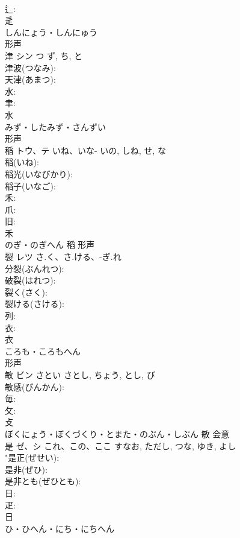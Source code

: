 \documentclass[8pt]{extreport}
\begin{document}
\begin{CJK}{UTF8}{min}
\\	辶: 
\\	辵	
\\	しんにょう・しんにゅう	
\\	形声 
\\	津	シン	つ	ず, ち, と	
\\	津波(つなみ): 
\\	天津(あまつ): 
\\	水: 
\\	聿: 
\\	水	
\\	みず・したみず・さんずい	
\\	形声 
\\	稲	トウ、テ	いね、いな-	いの, しね, せ, な	
\\	稲(いね): 
\\	稲光(いなびかり): 
\\	稲子(いなご): 
\\	禾: 
\\	爪: 
\\	旧: 
\\	禾	
\\	のぎ・のぎへん	稻	形声 
\\	裂	レツ	さ.く、さ.ける、-ぎ.れ		
\\	分裂(ぶんれつ): 
\\	破裂(はれつ): 
\\	裂く(さく): 
\\	裂ける(さける): 
\\	列: 
\\	衣: 
\\	衣	
\\	ころも・ころもへん	
\\	形声 
\\	敏	ビン	さとい	さとし, ちょう, とし, び	
\\	敏感(びんかん): 
\\	毎: 
\\	攵: 
\\	攴	
\\	ぼくにょう・ぼくづくり・とまた・のぶん・しぶん	敏	会意 
\\	是	ゼ、シ	これ、この、ここ	すなお, ただし, つな, ゆき, よし	
\\	"是正(ぜせい): 
\\	是非(ぜひ): 
\\	是非とも(ぜひとも): 
\\	日: 
\\	疋: 
\\	日	
\\	ひ・ひへん・にち・にちへん	

\end{CJK}
\end{document}
